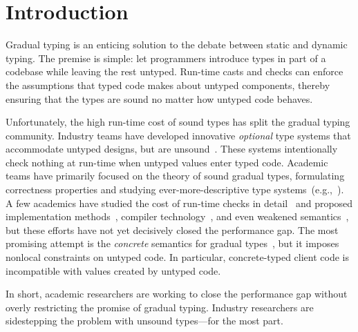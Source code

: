\documentclass[english,cleveref,crc]{programming}
\begin{document}
\section{Introduction}
\label{s:intro}

Gradual typing is an enticing solution to
the debate between static and dynamic typing.
The premise is simple: let programmers introduce types in part of a
codebase while leaving the rest untyped.
Run-time casts and checks can enforce the assumptions that typed code makes about
untyped components, thereby ensuring that the types are sound no matter how
untyped code behaves.

Unfortunately, the high run-time cost of sound types has split
the gradual typing community.
Industry teams have developed innovative \emph{optional} type systems that accommodate
untyped designs, but are unsound~\cite{bat-ecoop-2014,rch-popl-2012,cvgrl-oopsla-2017,pep484}.
These systems intentionally check nothing at run-time when untyped values enter
typed code.
Academic teams have primarily focused on the theory of sound
gradual types, formulating correctness properties and studying ever-more-descriptive
type systems~(e.g.,~\cite{sgt-jfp-2016,clps-popl-2019,nla-popl-2019,mgt-oopsla-2021}).
A few academics have studied the cost of run-time checks
in detail~\cite{tfgnvf-popl-2016,gtnffvf-jfp-2019}
and proposed implementation methods~\cite{kas-pldi-2019,fgsfs-oopsla-2018},
compiler technology~\cite{vsc-dls-2019,bbst-oopsla-2017},
and even weakened semantics~\cite{glfd-pj-2022,vss-popl-2017,gi-scp-2020},
but these efforts have not yet decisively closed the performance gap.
The most promising attempt is the \emph{concrete\/} semantics
for gradual types~\cite{clzv-ecoop-2018,mt-oopsla-2017,wzlov-popl-2010}, but it imposes nonlocal
constraints on untyped code.
In particular, concrete-typed client code is incompatible with
values created by untyped code.

In short, academic researchers are working to close the performance gap
without overly restricting the promise of gradual typing.
Industry researchers are sidestepping the problem with unsound types---for the most part.
\end{document}
